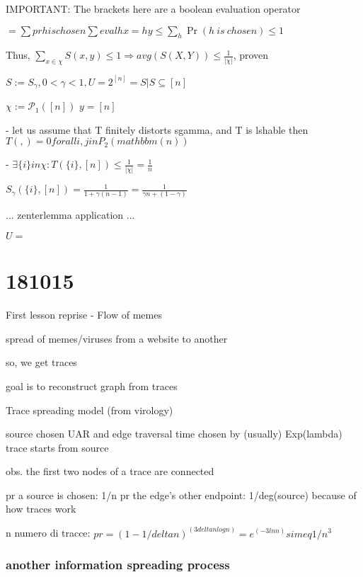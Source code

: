 \documentclass{report}
\begin{document}
	IMPORTANT: The brackets here are a boolean evaluation operator
	
	$= \sum pr h is chosen \sum eval hx = hy \leq \sum_h \Pr(h\ is\ chosen) \leq 1$
	
	Thus, $\sum_{x \in \chi}S(x, y) \leq 1 \Rightarrow avg(S(X, Y)) \leq \frac{1}{|\chi|}$, proven
	
	
	
	
	$S:= S_\gamma , 0 < \gamma < 1, U=2^{[n]}={S|S\subseteq [n]}$ %
	
	$\chi := \mathcal{P}_1([n])$
	$y = [n]$
	
	 - let us assume that T finitely distorts sgamma, and T is lshable
	then $T({},{}) = 0 forall {i, j} in P_2(mathbbm(n))$
	
	 - $\exists \{i\} in \chi : T(\{i\}, [n]) \leq \frac{1}{|\chi|} = \frac{1}{n}$
	 
	 $S_\gamma(\{i\}, [n]) = \frac{1}{1 + \gamma(n-1)} = \frac{1}{\gamma n + (1-\gamma)}$
	 
	 ...
	 zenterlemma application
	 ...
	
	
	
	$ U = {}$
	
	
	\chapter{181015}
	
	First lesson reprise - Flow of memes
	
	spread of memes/viruses from a website to another
	
	so, we get traces
	
	goal is to reconstruct graph from traces
	
	Trace spreading model (from virology)
	
	source chosen UAR and edge traversal time chosen by (usually) Exp(lambda)
	trace starts from source
	
	obs. the first two nodes of a trace are connected
	
	pr a source is chosen: 1/n
	pr the edge's other endpoint: 1/deg(source) because of how traces work
	
	n numero di tracce: $pr = (1-1/deltan)^(3deltanlogn) = e^(-3lnn) simeq 1/n^3$
	
	
	\subsection{another information spreading process}
	
\end{document}
